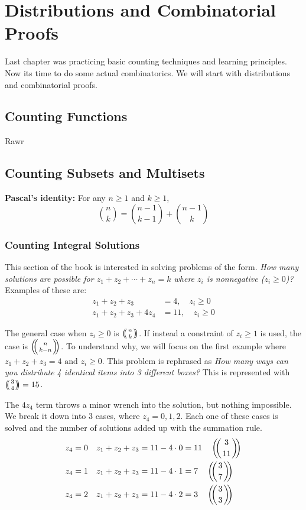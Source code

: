 \documentclass{article}
\begin{document}
\section{Distributions and Combinatorial Proofs}

Last chapter was practicing basic counting techniques and learning principles. Now its time to do some actual combinatorics. We will start with distributions and combinatorial proofs.

\subsection{Counting Functions}
Rawr

\subsection{Counting Subsets and Multisets}

\begin{thm}
\textbf{Pascal's identity:} For any $n \ge 1$ and $k \ge 1$,
\begin{equation*}
    \binom{n}{k} = \binom{n-1}{k-1} + \binom{n-1}{k}
\end{equation*}
\end{thm}

\subsubsection{Counting Integral Solutions}

This section of the book is interested in solving problems of the form. \textit{How many solutions are possible for $z_1 + z_2 + \cdots + z_n = k$ where $z_i$ is nonnegative ($z_i \ge 0$)?} Examples of these are:
\begin{align*}
    z_1 + z_2 + z_3 & = 4, \quad z_i \ge 0 \\
    z_1 + z_2 + z_3 + 4z_4 & = 11, \quad z_i \ge 0
\end{align*}

The general case when $z_i \ge 0$ is $\multiset{n}{k}$. If instead a constraint of $z_i \ge 1$ is used, the case is $\multiset{n}{k-n}$. To understand why, we will focus on the first example where $z_1 + z_2 + z_3 = 4 \text{ and } z_i \ge 0 $. This problem is rephrased as \textit{How many ways can you distribute 4 identical items into 3 different boxes?} This is represented with $\multiset{3}{4} = 15$.

\medskip
The $4z_4$ term throws a minor wrench into the solution, but nothing impossible. We break it down into 3 cases, where $z_4 = 0, 1, 2$. Each one of these cases is solved and the number of solutions added up with the summation rule.
\begin{align*}
    z_4 = 0 \quad z_1 + z_2 + z_3 & = 11 - 4 \cdot 0 = 11 \quad \multiset{3}{11} \\
    z_4 = 1 \quad z_1 + z_2 + z_3 & = 11 - 4 \cdot 1 = 7 \quad \multiset{3}{7}\\
    z_4 = 2 \quad z_1 + z_2 + z_3 & = 11 - 4 \cdot 2 = 3 \quad \multiset{3}{3}
\end{align*}
\end{document}
